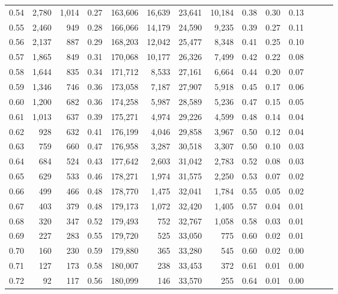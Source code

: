 \begin{tabular}{rrrrrrrrrrrrrr}
0.54 &  2,780 &  1,014 &  0.27 &  163,606 &   16,639 &  23,641 &  10,184 &  0.38 &  0.30 &      0.13 \\
0.55 &  2,460 &    949 &  0.28 &  166,066 &   14,179 &  24,590 &   9,235 &  0.39 &  0.27 &      0.11 \\
0.56 &  2,137 &    887 &  0.29 &  168,203 &   12,042 &  25,477 &   8,348 &  0.41 &  0.25 &      0.10 \\
0.57 &  1,865 &    849 &  0.31 &  170,068 &   10,177 &  26,326 &   7,499 &  0.42 &  0.22 &      0.08 \\
0.58 &  1,644 &    835 &  0.34 &  171,712 &    8,533 &  27,161 &   6,664 &  0.44 &  0.20 &      0.07 \\
0.59 &  1,346 &    746 &  0.36 &  173,058 &    7,187 &  27,907 &   5,918 &  0.45 &  0.17 &      0.06 \\
0.60 &  1,200 &    682 &  0.36 &  174,258 &    5,987 &  28,589 &   5,236 &  0.47 &  0.15 &      0.05 \\
0.61 &  1,013 &    637 &  0.39 &  175,271 &    4,974 &  29,226 &   4,599 &  0.48 &  0.14 &      0.04 \\
0.62 &    928 &    632 &  0.41 &  176,199 &    4,046 &  29,858 &   3,967 &  0.50 &  0.12 &      0.04 \\
0.63 &    759 &    660 &  0.47 &  176,958 &    3,287 &  30,518 &   3,307 &  0.50 &  0.10 &      0.03 \\
0.64 &    684 &    524 &  0.43 &  177,642 &    2,603 &  31,042 &   2,783 &  0.52 &  0.08 &      0.03 \\
0.65 &    629 &    533 &  0.46 &  178,271 &    1,974 &  31,575 &   2,250 &  0.53 &  0.07 &      0.02 \\
0.66 &    499 &    466 &  0.48 &  178,770 &    1,475 &  32,041 &   1,784 &  0.55 &  0.05 &      0.02 \\
0.67 &    403 &    379 &  0.48 &  179,173 &    1,072 &  32,420 &   1,405 &  0.57 &  0.04 &      0.01 \\
0.68 &    320 &    347 &  0.52 &  179,493 &      752 &  32,767 &   1,058 &  0.58 &  0.03 &      0.01 \\
0.69 &    227 &    283 &  0.55 &  179,720 &      525 &  33,050 &     775 &  0.60 &  0.02 &      0.01 \\
0.70 &    160 &    230 &  0.59 &  179,880 &      365 &  33,280 &     545 &  0.60 &  0.02 &      0.00 \\
0.71 &    127 &    173 &  0.58 &  180,007 &      238 &  33,453 &     372 &  0.61 &  0.01 &      0.00 \\
0.72 &     92 &    117 &  0.56 &  180,099 &      146 &  33,570 &     255 &  0.64 &  0.01 &      0.00 \\

\end{tabular}
